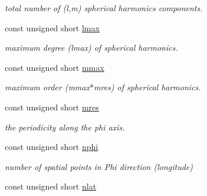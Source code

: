 \begin{DoxyCompactItemize}
\begin{DoxyCompactList}\small\item\em total number of (l,m) spherical harmonics components. \end{DoxyCompactList}\item 
\hypertarget{structshtns__info_a180c71be6e7bf33c058fd5049ac724a4}{}const unsigned short \hyperlink{structshtns__info_a180c71be6e7bf33c058fd5049ac724a4}{lmax}\label{structshtns__info_a180c71be6e7bf33c058fd5049ac724a4}

\begin{DoxyCompactList}\small\item\em maximum degree (lmax) of spherical harmonics. \end{DoxyCompactList}\item 
\hypertarget{structshtns__info_a4468777107573c3e38b8c1217e761239}{}const unsigned short \hyperlink{structshtns__info_a4468777107573c3e38b8c1217e761239}{mmax}\label{structshtns__info_a4468777107573c3e38b8c1217e761239}

\begin{DoxyCompactList}\small\item\em maximum order (mmax$\ast$mres) of spherical harmonics. \end{DoxyCompactList}\item 
\hypertarget{structshtns__info_ae82b68418cde6ad16076b3a04b1b8725}{}const unsigned short \hyperlink{structshtns__info_ae82b68418cde6ad16076b3a04b1b8725}{mres}\label{structshtns__info_ae82b68418cde6ad16076b3a04b1b8725}

\begin{DoxyCompactList}\small\item\em the periodicity along the phi axis. \end{DoxyCompactList}\item 
\hypertarget{structshtns__info_a5d110424cd07280d6028209a77846ff7}{}const unsigned short \hyperlink{structshtns__info_a5d110424cd07280d6028209a77846ff7}{nphi}\label{structshtns__info_a5d110424cd07280d6028209a77846ff7}

\begin{DoxyCompactList}\small\item\em number of spatial points in Phi direction (longitude) \end{DoxyCompactList}\item 
\hypertarget{structshtns__info_a1374b402fb674c589af64c342652d8f2}{}const unsigned short \hyperlink{structshtns__info_a1374b402fb674c589af64c342652d8f2}{nlat}\label{structshtns__info_a1374b402fb674c589af64c342652d8f2}


\end{DoxyCompactItemize}
